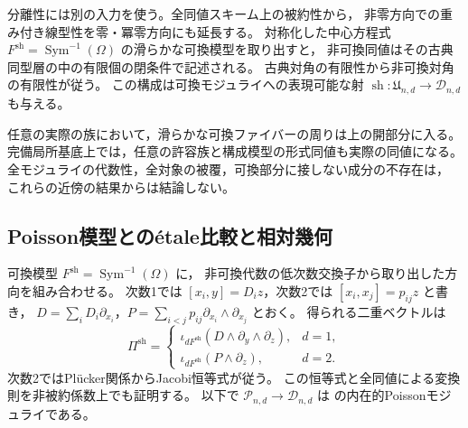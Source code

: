\documentclass[a4paper,11pt]{ltjsarticle}
\numberwithin{equation}{section}
\theoremstyle{plain}
\theoremstyle{definition}
\theoremstyle{remark}
\begin{document}
分離性には別の入力を使う。全同値スキーム上の被約性から，
非零方向での重み付き線型性を零・冪零方向にも延長する。
対称化した中心方程式
$F^{\mathrm{sh}}=\operatorname{Sym}^{-1}(\Omega)$ の滑らかな可換模型を取り出すと，
非可換同値はその古典同型層の中の有限個の閉条件で記述される。
古典対角の有限性から非可換対角の有限性が従う。
この構成は可換モジュライへの表現可能な射
$\operatorname{sh}:\mathfrak U_{n,d}\to\mathcal D_{n,d}$ も与える。

任意の実際の族において，滑らかな可換ファイバーの周りは上の開部分に入る。
完備局所基底上では，任意の許容族と構成模型の形式同値も実際の同値になる。
全モジュライの代数性，全対象の被覆，可換部分に接しない成分の不存在は，
これらの近傍の結果からは結論しない。

\subsection{Poisson模型との\'{e}tale比較と相対幾何}
可換模型 $F^{\mathrm{sh}}=\operatorname{Sym}^{-1}(\Omega)$ に，
非可換代数の低次数交換子から取り出した方向を組み合わせる。
次数1では $[x_i,y]=D_i z$，次数2では $[x_i,x_j]=p_{ij}z$ と書き，
$D=\sum_iD_i\partial_{x_i}$，$P=\sum_{i<j}p_{ij}\partial_{x_i}\wedge\partial_{x_j}$ とおく。
得られる二重ベクトルは
\[
 \Pi^{\mathrm{sh}}=
 \begin{cases}
 \iota_{dF^{\mathrm{sh}}}(D\wedge\partial_y\wedge\partial_z),&d=1,\\
 \iota_{dF^{\mathrm{sh}}}(P\wedge\partial_z),&d=2.
 \end{cases}
\]
次数2ではPl\"ucker関係からJacobi恒等式が従う。
この恒等式と全同値による変換則を非被約係数上でも証明する。
以下で $\mathcal P_{n,d}\to\mathcal D_{n,d}$ は
\cite{PoissonDP}の内在的Poissonモジュライである。
\end{document}
